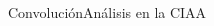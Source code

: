\begin{frame}[c]{Convolución}{Análisis en la CIAA}
   \protoboardicon
   \begin{columns}[c]
      \hspace{2pt}
      \begin{column}{.5\textwidth}
         
      \end{column}
      \hspace{2pt}
      \vrule
      \hspace{2pt}
      \begin{column}{.5\textwidth}
         
      \end{column}
   \end{columns}
   \vfill
\end{frame}
